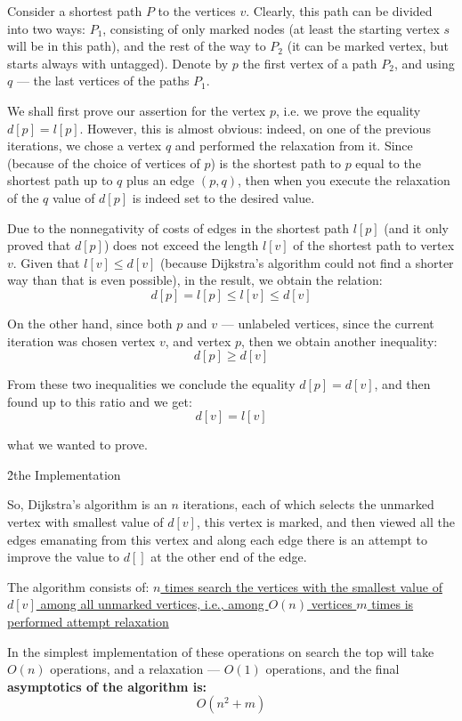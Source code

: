 Consider a shortest path $P$ to the vertices $v$. Clearly, this path can be divided into two ways: $P_1$, consisting of only marked nodes (at least the starting vertex $s$ will be in this path), and the rest of the way to $P_2$ (it can be marked vertex, but starts always with untagged). Denote by $p$ the first vertex of a path $P_2$, and using $q$ --- the last vertices of the paths $P_1$.

We shall first prove our assertion for the vertex $p$, i.e. we prove the equality $d[p] = l[p]$. However, this is almost obvious: indeed, on one of the previous iterations, we chose a vertex $q$ and performed the relaxation from it. Since (because of the choice of vertices of $p$) is the shortest path to $p$ equal to the shortest path up to $q$ plus an edge $(p,q)$, then when you execute the relaxation of the $q$ value of $d[p]$ is indeed set to the desired value.

Due to the nonnegativity of costs of edges in the shortest path $l[p]$ (and it only proved that $d[p]$) does not exceed the length $l[v]$ of the shortest path to vertex $v$. Given that $l[v] \le d[v]$ (because Dijkstra's algorithm could not find a shorter way than that is even possible), in the result, we obtain the relation:
$$ d[p] = l[p] \le l[v] \le d[v] $$

On the other hand, since both $p$ and $v$ --- unlabeled vertices, since the current iteration was chosen vertex $v$, and vertex $p$, then we obtain another inequality:
$$ d[p] \ge d[v] $$

From these two inequalities we conclude the equality $d[p] = d[v]$, and then found up to this ratio and we get:
$$ d[v] = l[v] $$

what we wanted to prove.

\h2{the Implementation}

So, Dijkstra's algorithm is an $n$ iterations, each of which selects the unmarked vertex with smallest value of $d[v]$, this vertex is marked, and then viewed all the edges emanating from this vertex and along each edge there is an attempt to improve the value to $d[]$ at the other end of the edge.

The algorithm consists of:
\ul{
\li $n$ times search the vertices with the smallest value of $d[v]$ among all unmarked vertices, i.e., among $O(n)$ vertices
\li $m$ times is performed attempt relaxation
}

In the simplest implementation of these operations on search the top will take $O(n)$ operations, and a relaxation --- $O(1)$ operations, and the final \bf{asymptotics} of the algorithm is:
$$ O(n^2+m) $$

